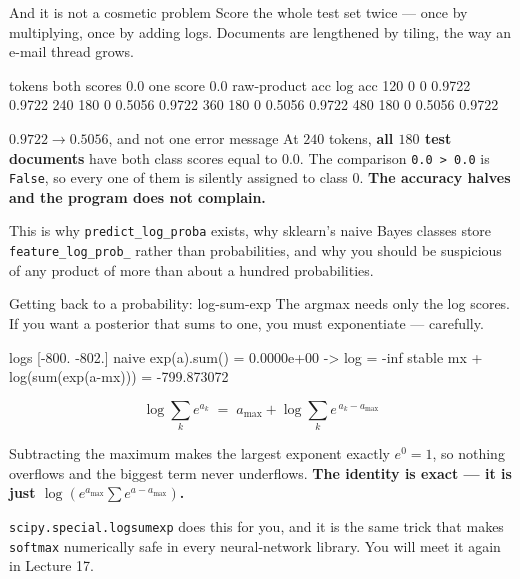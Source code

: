 \documentclass[aspectratio=169]{beamer}
\begin{document}
\begin{frame}[fragile,shrink=7]{And it is not a cosmetic problem}
Score the whole test set twice --- once by multiplying, once by adding logs.
Documents are lengthened by tiling, the way an e-mail thread grows.
\begin{outblk}
    tokens  both scores 0.0  one score 0.0  raw-product acc  log acc
       120                0              0           0.9722   0.9722
       240              180              0           0.5056   0.9722
       360              180              0           0.5056   0.9722
       480              180              0           0.5056   0.9722
\end{outblk}
\begin{alertblock}{$0.9722 \rightarrow 0.5056$, and not one error message}
  \footnotesize At $240$ tokens, \textbf{all $180$ test documents} have both
  class scores equal to $0.0$. The comparison \texttt{0.0 > 0.0} is
  \texttt{False}, so every one of them is silently assigned to class $0$.
  \textbf{The accuracy halves and the program does not complain.}
\end{alertblock}
\begin{center}\small
  This is why \texttt{predict\_log\_proba} exists, why sklearn's naive Bayes
  classes store \texttt{feature\_log\_prob\_} rather than probabilities, and
  why you should be suspicious of any product of more than about a hundred
  probabilities.
\end{center}
\end{frame}

\begin{frame}[fragile,shrink=6]{Getting back to a probability: log-sum-exp}
The argmax needs only the log scores. If you want a posterior that sums to
one, you must exponentiate --- carefully.
\begin{outblk}
   logs [-800. -802.]
   naive  exp(a).sum() = 0.0000e+00  -> log = -inf
   stable mx + log(sum(exp(a-mx))) = -799.873072
\end{outblk}
\[
  \log \sum_k e^{a_k}
    \;=\; a_{\max} + \log \sum_k e^{\,a_k - a_{\max}}
\]
\begin{center}\small
  Subtracting the maximum makes the largest exponent exactly $e^0 = 1$, so
  nothing overflows and the biggest term never underflows. \textbf{The
  identity is exact --- it is just $\log(e^{a_{\max}} \sum e^{a-a_{\max}})$.}
\end{center}
\begin{alertblock}{}
  \centering\footnotesize
  \texttt{scipy.special.logsumexp} does this for you, and it is the same
  trick that makes \texttt{softmax} numerically safe in every neural-network
  library. You will meet it again in Lecture 17.
\end{alertblock}
\end{frame}
\end{document}
